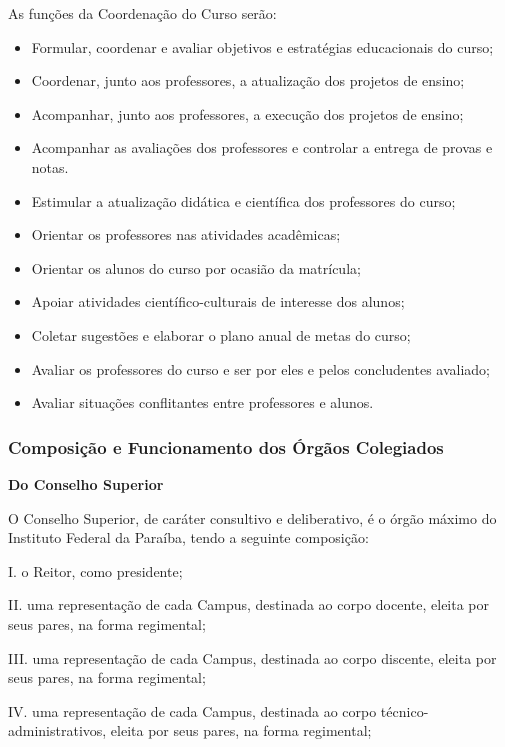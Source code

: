As funções da Coordenação do Curso serão:
\begin{itemize}
\item Formular, coordenar e avaliar objetivos e estratégias educacionais do curso;
\item Coordenar, junto aos professores, a atualização dos projetos de ensino;
\item Acompanhar, junto aos professores, a execução dos projetos de ensino;
\item Acompanhar as avaliações dos professores e controlar a entrega de provas e notas.
\item Estimular a atualização didática e científica dos professores do curso;
\item Orientar os professores nas atividades acadêmicas;
\item Orientar os alunos do curso por ocasião da matrícula;
\item Apoiar atividades científico-culturais de interesse dos alunos;
\item Coletar sugestões e elaborar o plano anual de metas do curso;
\item Avaliar os professores do curso e ser por eles e pelos concludentes avaliado;
\item Avaliar situações conflitantes entre professores e alunos.
\end{itemize}

\subsubsection{Composição e Funcionamento dos Órgãos Colegiados}

\vspace{4mm}
\textbf{Do Conselho Superior}
\vspace{4mm}

O Conselho Superior, de caráter consultivo e deliberativo, é o órgão máximo do Instituto Federal da Paraíba, tendo a seguinte composição:

I.	o Reitor, como presidente;

II.	uma representação de cada Campus, destinada ao corpo docente, eleita por seus pares, na forma regimental;

III.	uma representação de cada Campus, destinada ao corpo discente, eleita por seus pares, na forma regimental;

IV.	uma representação de cada Campus, destinada ao corpo técnico-administrativos, eleita por seus pares, na forma regimental;

